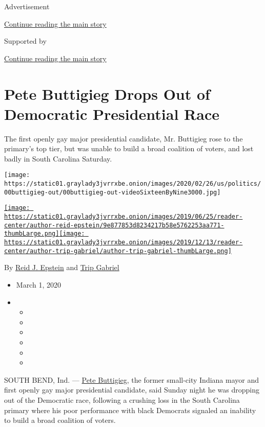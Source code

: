 Advertisement

\protect\hyperlink{after-top}{Continue reading the main story}

Supported by

\protect\hyperlink{after-sponsor}{Continue reading the main story}

\hypertarget{pete-buttigieg-drops-out-of-democratic-presidential-race}{%
\section{Pete Buttigieg Drops Out of Democratic Presidential
Race}\label{pete-buttigieg-drops-out-of-democratic-presidential-race}}

The first openly gay major presidential candidate, Mr. Buttigieg rose to
the primary's top tier, but was unable to build a broad coalition of
voters, and lost badly in South Carolina Saturday.

\texttt{[image: https://static01.graylady3jvrrxbe.onion/images/2020/02/26/us/politics/00buttigieg-out/00buttigieg-out-videoSixteenByNine3000.jpg]}

\href{https://www.nytimes3xbfgragh.onion/by/reid-j-epstein}{\texttt{[image: https://static01.graylady3jvrrxbe.onion/images/2019/06/25/reader-center/author-reid-epstein/9e877853d8234217b58e5762253aa771-thumbLarge.png]}}\href{https://www.nytimes3xbfgragh.onion/by/trip-gabriel}{\texttt{[image: https://static01.graylady3jvrrxbe.onion/images/2019/12/13/reader-center/author-trip-gabriel/author-trip-gabriel-thumbLarge.png]}}

By \href{https://www.nytimes3xbfgragh.onion/by/reid-j-epstein}{Reid J.
Epstein} and
\href{https://www.nytimes3xbfgragh.onion/by/trip-gabriel}{Trip Gabriel}

\begin{itemize}
\item
  March 1, 2020
\item
  \begin{itemize}
  \item
  \item
  \item
  \item
  \item
  \item
  \end{itemize}
\end{itemize}

SOUTH BEND, Ind. ---
\href{https://www.nytimes3xbfgragh.onion/interactive/2020/us/elections/pete-buttigieg.html}{Pete
Buttigieg}, the former small-city Indiana mayor and first openly gay
major presidential candidate, said Sunday night he was dropping out of
the Democratic race, following a crushing loss in the South Carolina
primary where his poor performance with black Democrats signaled an
inability to build a broad coalition of voters.

